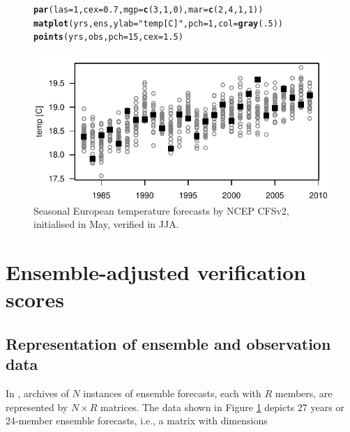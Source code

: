 \documentclass[article]{jss}\usepackage{graphicx, color}
\makeatletter
\def\maxwidth{ %
  \ifdim\Gin@nat@width>\linewidth
    \linewidth
  \else
    \Gin@nat@width
  \fi
}
\newcommand{\hlfunctioncall}[1]{\textcolor[rgb]{0,0.501960784313725,0.752941176470588}{\textbf{#1}}}%
\newcommand{\hlstring}[1]{\textcolor[rgb]{0.650980392156863,0.52156862745098,0}{#1}}%
\newenvironment{kframe}{%
 \def\at@end@of@kframe{}%
 \ifinner\ifhmode%
  \def\at@end@of@kframe{\end{minipage}}%
  \begin{minipage}{\columnwidth}%
 \fi\fi%
 \def\FrameCommand##1{\hskip\@totalleftmargin \hskip-\fboxsep
 \colorbox{shadecolor}{##1}\hskip-\fboxsep
     \hskip-\linewidth \hskip-\@totalleftmargin \hskip\columnwidth}%
 \MakeFramed {\advance\hsize-\width
   \@totalleftmargin\z@ \linewidth\hsize
   \@setminipage}}%
 {\par\unskip\endMakeFramed%
 \at@end@of@kframe}
\newenvironment{knitrout}{}{} %
\makeatother
\begin{document}
\begin{figure}
\begin{center}
%
\begin{knitrout}
\color{fgcolor}\begin{kframe}
\begin{alltt}
\hlfunctioncall{par}(las=1, cex=0.7, mgp=\hlfunctioncall{c}(3, 1, 0), mar=\hlfunctioncall{c}(2,4,1,1))
\hlfunctioncall{matplot}(yrs, ens, ylab=\hlstring{"temp [C]"}, pch=1, col=\hlfunctioncall{gray}(.5))
\hlfunctioncall{points}(yrs, obs, pch=15, cex=1.5)
\end{alltt}
\end{kframe}
\includegraphics[width=\maxwidth]{figure/gfs-plot} 

\end{knitrout}

%
\end{center}
\caption{Seasonal European temperature forecasts by NCEP CFSv2, initialised in May, verified in JJA.}
\label{gfs-plot}
\end{figure}


\section{Ensemble-adjusted verification scores}

\subsection{Representation of ensemble and observation data}

In , archives of $N$ instances of ensemble forecasts, each with $R$ members, are represented by $N\times R$ matrices.
The data shown in Figure \ref{gfs-plot} depicts 27 years or 24-member ensemble forecasts, i.e., a matrix with dimensions
\end{document}

